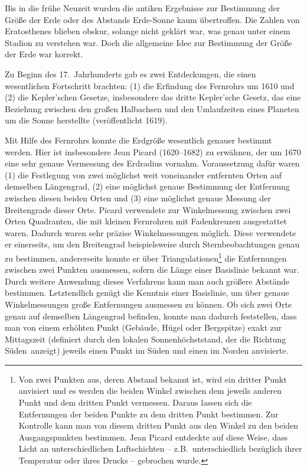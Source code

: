 Bis in die fr\"uhe Neuzeit wurden die antiken Ergebnisse zur Bestimmung der Gr\"o\ss e
der Erde oder des Abstands Erde-Sonne kaum \"ubertroffen. Die Zahlen von Eratosthenes
blieben obskur, solange nicht gekl\"art war, was genau unter einem Stadion zu verstehen war.
Doch die allgemeine Idee zur Bestimmung der Gr\"o\ss e der Erde war korrekt. 

Zu Beginn des 17.\ Jahrhunderts gab es zwei Entdeckungen, die einen wesentlichen
Fortschritt brachten: (1) die Erfindung des Fernrohrs um 1610 und (2) die Kepler'schen Gesetze,
insbesondere das dritte Kepler'sche Gesetz, das eine Beziehung zwischen den gro\ss en Halbachsen
und den Umlaufzeiten eines Planeten um die Sonne herstellte (ver\"offentlicht 1619). 

Mit Hilfe des Fernrohrs konnte die Erdgr\"o\ss e wesentlich genauer bestimmt werden. Hier ist
insbesondere 
Jean Picard (1620--1682) zu erw\"ahnen, der um 1670 eine sehr genaue Vermessung
des Erdradius vornahm. Voraussetzung daf\"ur waren (1) die Festlegung von zwei 
m\"oglichst weit voneinander entfernten Orten auf demselben L\"angengrad, (2) eine 
m\"oglichst genaue Bestimmung der Entfernung zwischen diesen beiden Orten und (3) eine
m\"oglichst genaue Messung der Breitengrade dieser Orte. Picard verwendete zur Winkelmessung
zwischen zwei Orten Quadranten, die mit kleinen Fernrohren mit Fadenkreuzen ausgestattet
waren. Dadurch waren sehr pr\"azise Winkelmessungen m\"oglich. Diese verwendete er einerseits,
um den Breitengrad beispielsweise durch Sternbeobachtungen genau zu bestimmen, andererseits
konnte er \"uber 
Triangulationen\footnote{Von zwei Punkten aus, deren Abstand bekannt ist, wird
ein dritter Punkt anvisiert und es werden die beiden Winkel zwischen dem jeweils anderen Punkt
und dem dritten Punkt vermessen. Daraus lassen sich die Entfernungen der beiden Punkte zu
dem dritten Punkt bestimmen. Zur Kontrolle kann man von diesem dritten Punkt aus den Winkel zu
den beiden Ausgangspunkten bestimmen. Jean Picard entdeckte auf diese Weise, dass Licht
an unterschiedlichen Luftschichten -- z.B.\ unterschiedlich bez\"uglich ihrer Temperatur oder ihres
Drucks -- gebrochen wurde.} 
die Entfernungen zwischen zwei Punkten ausmessen, sofern
die L\"ange einer Basislinie bekannt war. Durch weitere Anwendung dieses Verfahrens kann man
auch gr\"o\ss ere Abst\"ande bestimmen. Letztendlich gen\"ugt die Kenntnis einer Basislinie, um
\"uber genaue Winkelmessungen gro\ss e Entfernungen ausmessen zu k\"onnen. Ob sich zwei
Orte genau auf demselben L\"angengrad befinden, konnte man dadurch feststellen, dass man
von einem erh\"ohten Punkt (Geb\"aude, H\"ugel oder Bergspitze) exakt zur Mittagszeit (definiert
durch den lokalen Sonnenh\"ochststand, der die Richtung \glqq S\"uden\grqq\ anzeigt) 
jeweils einen Punkt im S\"uden und einen im Norden anvisierte. 

